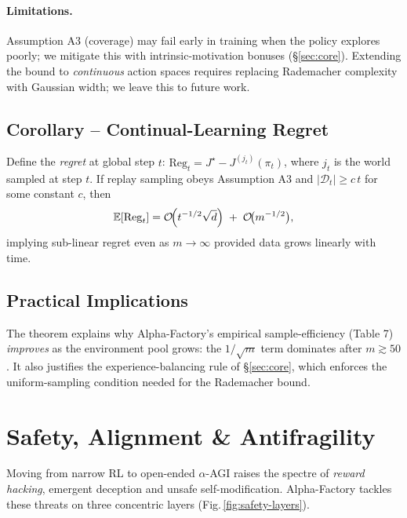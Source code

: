 \paragraph{Limitations.}
Assumption A3 (coverage) may fail early in training when the policy explores
poorly; we mitigate this with intrinsic-motivation bonuses (§\ref{sec:core}).
Extending the bound to \emph{continuous} action spaces requires replacing
Rademacher complexity with Gaussian width; we leave this to future work.

\subsection{Corollary – Continual-Learning Regret}

Define the \emph{regret} at global step $t$:
$\mathrm{Reg}_t=J^\star - J^{(j_t)}(\pi_t)$, where $j_t$ is the world sampled
at step $t$.  If replay sampling obeys Assumption A3 and
$|\mathcal D_t|\ge c\,t$ for some constant $c$, then
\[
\mathbb E[\mathrm{Reg}_t]
=\mathcal O\!\Bigl(t^{-1/2}\sqrt{d}\Bigr)\;+\;\mathcal O\!\bigl(m^{-1/2}\bigr),
\]
implying sub-linear regret even as $m\to\infty$ provided data grows linearly
with time.

\subsection{Practical Implications}

The theorem explains why Alpha-Factory’s empirical sample-efficiency (Table 7)
\emph{improves} as the environment pool grows: the $1/\sqrt m$ term dominates
after $m\gtrsim 50$.  It also justifies the experience-balancing rule of
§\ref{sec:core}, which enforces the uniform-sampling condition needed for the
Rademacher bound.

\section{Safety, Alignment \& Antifragility}\label{sec:safety}

Moving from narrow RL to open-ended $\alpha$-AGI raises the spectre of
\emph{reward hacking}, emergent deception and unsafe self-modification.
Alpha-Factory tackles these threats on three concentric layers
(Fig.\,\ref{fig:safety-layers}).


